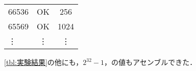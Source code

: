 \begin{table}[h]
\begin{minipage}[t]{0.45\textwidth}
{\begin{tabular}{lcc}
                66536                    & OK       & 256                       \\
                65569                    & OK       & 1024                      \\
                \vdots                   & \vdots   & \vdots                    \\
                \hline
            \end{tabular}
        }
    \end{minipage}
    \begin{minipage}[t]{0.45\textwidth}
        \hspace{1\zw}
        \ref{tbl:実験結果}の他にも，\(2^{32}-1\)，の値もアセンブルできた．
    \end{minipage}
\end{table}